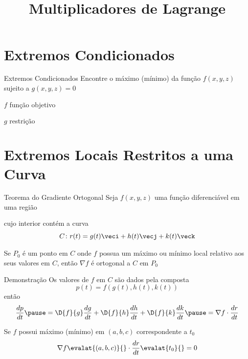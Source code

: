 
\usepackage{calculo_varias_variaveis-1}

\title {Multiplicadores de Lagrange}



\addtitle

\section{Extremos Condicionados}

\begin{frame}{Extremos Condicionados}
  Encontre o máximo (mínimo) da função \(f(x, y, z)\)\\[2mm]
  sujeito a \(g(x, y, z) = 0\)

  \pause
  \vspace{2\baselineskip}
  \emph{$f$} função objetivo

  \pause
  \emph{$g$} restrição
\end{frame}


\section{Extremos Locais Restritos a uma Curva}

\begin{frame}{Teorema do Gradiente Ortogonal}
  Seja \(f(x, y, z)\) uma função diferenciável em uma região

  \pause
  cujo interior contém a curva
  \[
    C\colon r(t)
    = g(t)\veci
    + h(t)\vecj
    + k(t)\veck
  \]

  \pause
  Se $P_0$ é um ponto em $C$ onde $f$ possua um máximo ou mínimo local relativo
  aos seus valores em $C$,
  \pause
  então \(\nabla f\) é ortogonal a $C$ em $P_0$
\end{frame}

\begin{frame}{Demonstração}
  Os valores de $f$ em $C$ são dados pela composta
  \[
    p(t) = f(g(t), h(t), k(t))
  \]
  \pause
  então
  \[
    \frac{dp}{dt}
    \pause
    = \D{f}{g}\frac{dg}{dt}
    + \D{f}{h}\frac{dh}{dt}
    + \D{f}{k}\frac{dk}{dt}
    \pause
    = \nabla f \cdot \frac{dr}{dt}
  \]

  \pause
  Se $f$ possui máximo (mínimo) em \((a, b, c)\) correspondente a $t_0$
  \[
    \nabla f\evalat{(a, b, c)}{} \cdot \frac{dr}{dt}\evalat{t_0}{} = 0
  \]
\end{frame}


